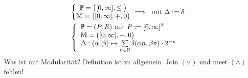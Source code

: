 \begin{beispiel}
	\begin{align*}
		&\left\lbrace\begin{matrix}
			\mathbb{P}=\big([0,\infty],\leq\big)\\
			\mathbb{M}=\big([0,\infty],+,0\big)
		\end{matrix}\right.\implies \text{ mit }\Delta:=\delta\\
		&\left\lbrace\begin{array}{l}
			\mathbb{P}=(P,R)\text{ mit } P:=[0,\infty]^{\mathbb{N}}\\
			\mathbb{M}=\big([0,\infty],+,0\big)\\
			\Delta:(\alpha,\beta)\mapsto\sum\limits_{n\in\mathbb{N}}\delta(\alpha n,\beta n)\cdot 2^{-n}
		\end{array}\right.
	\end{align*}
	Was ist mit Modularität? Definition ist zu allgemein. Join $(\vee)$ und meet $(\wedge)$ fehlen!
\end{beispiel}
